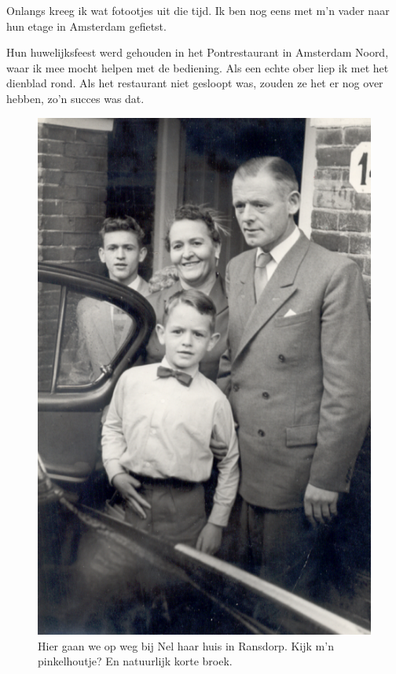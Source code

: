 \documentclass[12pt,twoside]{memoir}
\begin{document}
Onlangs kreeg ik wat fotootjes uit die tijd. Ik ben nog eens met m’n vader naar hun etage in Amsterdam gefietst. 

Hun huwelijksfeest werd gehouden in het Pontrestaurant in Amsterdam Noord, waar ik mee mocht helpen met de bediening. Als een echte ober liep ik met het dienblad rond. Als het restaurant niet gesloopt was, zouden ze het er nog over hebben, zo’n succes was dat.

\begin{figure}
\includegraphics[width=\textwidth]{img/ch5/trouwengn}
\caption*{\footnotesize Hier gaan we op weg bij Nel haar huis in Ransdorp. Kijk m’n pinkelhoutje? En natuurlijk korte broek.}
\end{figure}
\end{document}

